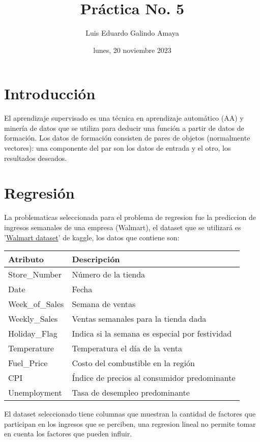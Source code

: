 \documentclass[11pt]{article}
\author{Luis Eduardo Galindo Amaya}
\date{lunes, 20 noviembre 2023}
\title{Práctica No. 5}
\begin{document}
\tableofcontents
\pagebreak


\section{Introducción}
\label{sec:org0c1492b}
\autocite{wiki:Aprendizaje_supervisado} El aprendizaje supervisado
es una técnica en aprendizaje automático (AA) y minería de datos que
se utiliza para deducir una función a partir de datos de formación.
Los datos de formación consisten de pares de objetos 
(normalmente vectores): una componente del par son los datos de entrada
y el otro, los resultados deseados.


\section{Regresión}
\label{sec:orgb2dfab7}
La problematicas seleccionada para el problema de regresion fue la
prediccion de ingresos semanales de una empresa (Walmart), el dataset
que se utilizará es '\href{https://www.kaggle.com/datasets/yasserh/walmart-dataset}{Walmart dataset}' de kaggle, los datos que
contiene son:

\begin{center}
\begin{tabularx}{0.8\textwidth}{l|l}
Atributo & Descripción\\
\hline
Store\_Number & Número de la tienda\\
Date & Fecha\\
Week\_of\_Sales & Semana de ventas\\
Weekly\_Sales & Ventas semanales para la tienda dada\\
Holiday\_Flag & Indica si la semana es especial por festividad\\
Temperature & Temperatura el día de la venta\\
Fuel\_Price & Costo del combustible en la región\\
CPI & Índice de precios al consumidor predominante\\
Unemployment & Tasa de desempleo predominante\\
\end{tabularx}

\end{center}

El dataset seleccionado tiene columnas que muestran la cantidad de
factores que participan en los ingresos que se perciben, una regresion
lineal no permite tomar en cuenta los factores que pueden influir.
\end{document}
